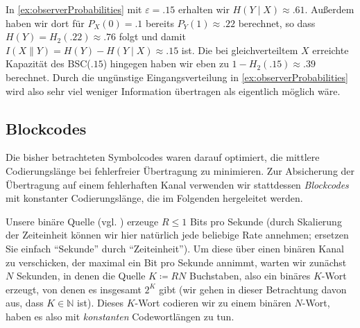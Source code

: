 \begin{example}
  In \cref{ex:observerProbabilities} mit $ε=\num{.15}$ erhalten wir $H(Y∣X) ≈ \num{.61}$. Außerdem haben wir dort für $P_X(0) = \num{.1}$ bereits $P_Y(1) ≈ \num{.22}$ berechnet, so dass $H(Y) = H_2(\num{.22}) ≈ \num{.76}$ folgt und damit $I(X∥Y) = H(Y) - H(Y∣X) ≈ \num{.15}$ ist. Die bei gleichverteiltem $X$ erreichte Kapazität des BSC($\num{.15}$) hingegen haben wir eben zu $1-H_2(\num{.15}) ≈\num{.39}$ berechnet. Durch die ungünstige Eingangsverteilung in \cref{ex:observerProbabilities} wird also sehr viel weniger Information übertragen als eigentlich möglich wäre.
\end{example}


\subsection{Blockcodes}
Die bisher betrachteten Symbolcodes waren darauf optimiert, die mittlere Codierungslänge bei fehlerfreier Übertragung zu minimieren. Zur Absicherung der Übertragung auf einem fehlerhaften Kanal verwenden wir stattdessen \emph{Blockcodes} mit konstanter Codierungslänge, die im Folgenden hergeleitet werden.

Unsere binäre Quelle (vgl. \pageref{sec:noisy}) erzeuge $R≤1$ Bits pro Sekunde (durch Skalierung der Zeiteinheit können wir hier natürlich jede beliebige Rate annehmen; ersetzen Sie einfach \enquote{Sekunde} durch \enquote{Zeiteinheit}). Um diese über einen binären Kanal zu verschicken, der maximal ein Bit pro Sekunde annimmt, warten wir zunächst $N$ Sekunden, in denen die Quelle $K\coloneqq RN$ Buchstaben, also ein binäres $K$-Wort erzeugt, von denen es insgesamt $2^K$ gibt (wir gehen in dieser Betrachtung davon aus, dass $K∈ℕ$ ist). Dieses $K$-Wort codieren wir zu einem binären $N$-Wort, haben es also mit \emph{konstanten} Codewortlängen zu tun.


